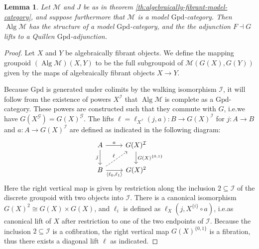 \documentclass[a4paper]{article}
\newtheorem{lemma}[theorem]{Lemma}
\theoremstyle{remark}
\theoremstyle{definition}
\begin{document}
\begin{lemma}
  \label{lem:algebraically-fibrant-lproper-simplicial}
  Let $\mathcal{M}$ and $J$ be as in theorem \ref{th:algebraically-fibrant-model-category}, and suppose furthermore that $\mathcal{M}$ is a model $\mathrm{Gpd}$-category.
  Then $\operatorname{Alg} \mathcal{M}$ has the structure of a model $\mathrm{Gpd}$-category, and the the adjunction $F \dashv G$ lifts to a Quillen $\mathrm{Gpd}$-adjunction.
\end{lemma}
\begin{proof}
  Let $X$ and $Y$ be algebraically fibrant objects.
  We define the mapping groupoid $(\operatorname{Alg} \mathcal{M})(X, Y)$ to be the full subgroupoid of $\mathcal{M}(G(X), G(Y))$ given by the maps of algebraically fibrant objects $X \rightarrow Y$.

  Because $\mathrm{Gpd}$ is generated under colimits by the walking isomorphism $\mathcal{I}$, it will follow from the existence of powers $X^\mathcal{I}$ that $\operatorname{Alg} \mathcal{M}$ is complete as a $\mathrm{Gpd}$-category.
  These powers are constructed such that they commute with $G$, i.e.\@ we have $G(X^\mathcal{G}) = G(X)^\mathcal{G}$.
  The lifts $\ell = \ell_{X^\mathcal{I}}(j, a) : B \rightarrow G(X)^\mathcal{I}$ for $j : A \rightarrow B$ and $a : A \rightarrow G(X)^\mathcal{I}$ are defined as indicated in the following diagram:
  \begin{equation}
    \begin{tikzcd}
      A \arrow[r, "a"] \arrow[d, "j"'] & G(X)^\mathcal{I} \arrow[d, "G(X)^{\{0, 1\}}"] \\
      B \arrow[r, "{\langle \ell_0, \ell_1 \rangle}"'] \arrow[ur, dashed, "\ell"] & G(X)^2
    \end{tikzcd}
    \label{eq:lift-in-power}
  \end{equation}
  Here the right vertical map is given by restriction along the inclusion $2 \subseteq \mathcal{I}$ of the discrete groupoid with two objects into $\mathcal{I}$.
  There is a canonical isomorphism $G(X)^2 \cong G(X) \times G(X)$, and $\ell_i$ is defined as $\ell_X(j, X^{\{i\}} \circ a)$, i.e.\@ as canonical lift of $X$ after restriction to one of the two endpoints of $\mathcal{I}$.
  Because the inclusion $2 \subseteq \mathcal{I}$ is a cofibration, the right vertical map $G(X)^{\{0, 1\}}$ is a fibration, thus there exists a diagonal lift $\ell$ as indicated.


\end{proof}
\end{document}
